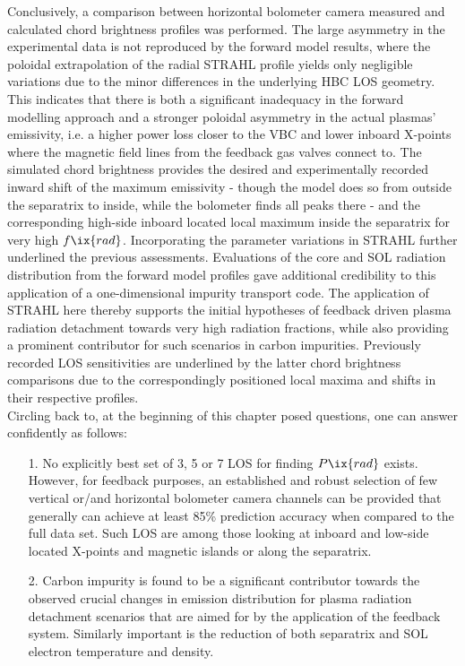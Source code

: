         Conclusively, a comparison between horizontal bolometer camera measured and calculated chord brightness profiles was performed. The large asymmetry in the experimental data is not reproduced by the forward model results, where the poloidal extrapolation of the radial STRAHL profile yields only negligible variations due to the minor differences in the underlying HBC LOS geometry. This indicates that there is both a significant inadequacy in the forward modelling approach and a stronger poloidal asymmetry in the actual plasmas' emissivity, i.e. a higher power loss closer to the VBC and lower inboard X-points where the magnetic field lines from the feedback gas valves connect to. The simulated chord brightness provides the desired and experimentally recorded inward shift of the maximum emissivity - though the model does so from outside the separatrix to inside, while the bolometer finds all peaks there - and the corresponding high-side inboard located local maximum inside the separatrix for very high $f\ix{rad}$. Incorporating the parameter variations in STRAHL further underlined the previous assessments. Evaluations of the core and SOL radiation distribution from the forward model profiles gave additional credibility to this application of a one-dimensional impurity transport code. The application of STRAHL here thereby supports the initial hypotheses of feedback driven plasma radiation detachment towards very high radiation fractions, while also providing a prominent contributor for such scenarios in carbon impurities. Previously recorded LOS sensitivities are underlined by the latter chord brightness comparisons due to the correspondingly positioned local maxima and shifts in their respective profiles.\\%
        Circling back to, at the beginning of this chapter posed questions, one can answer confidently as follows:%
%
    \begin{enumerate}%
        \item[1.]{%
            No explicitly best set of 3, 5 or 7 LOS for finding $P\ix{rad}$ exists. However, for feedback purposes, an established and robust selection of few vertical or/and horizontal bolometer camera channels can be provided that generally can achieve at least 85\% prediction accuracy when compared to the full data set. Such LOS are among those looking at inboard and low-side located X-points and magnetic islands or along the separatrix.}%
        \item[2.]{%
            Carbon impurity is found to be a significant contributor towards the observed crucial changes in emission distribution for plasma radiation detachment scenarios that are aimed for by the application of the feedback system. Similarly important is the reduction of both separatrix and SOL electron temperature and density.}%
    \end{enumerate}%